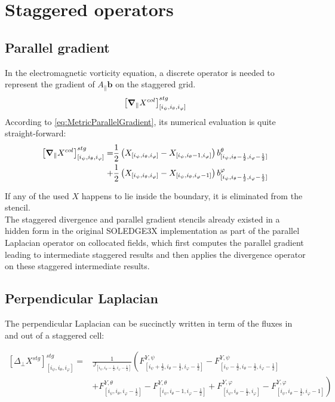 \section{Staggered operators}

\subsection{Parallel gradient}

In the electromagnetic vorticity equation, a discrete operator is needed to represent the gradient of $A_\parallel \mathbf{b}$ on the staggered grid.
$$\left[\grad_\parallel X^{col}\right]^{stg}_{[i_\psi,i_\theta, i_\varphi]}$$
According to \autoref{eq:MetricParallelGradient}, its numerical evaluation is quite straight-forward: 
\begin{align}
	\label{eq:NumericalStaggeredParallelGradientStencil}
	\left[\grad_\parallel X^{col}\right]^{stg}_{[i_\psi,i_\theta, i_\varphi]} =& \frac{1}{2}\left(X_{[i_\psi,i_\theta, i_\varphi]}-X_{[i_\psi,i_\theta-1, i_\varphi]}\right)b_{[i_\psi,i_\theta-\frac{1}{2}, i_\varphi-\frac{1}{2}]}^\theta \nonumber \\ +& 
	\frac{1}{2}\left(X_{[i_\psi,i_\theta, i_\varphi]}-X_{[i_\psi,i_\theta, i_\varphi-1]}\right)b_{[i_\psi,i_\theta-\frac{1}{2}, i_\varphi-\frac{1}{2}]}^\varphi
\end{align}

If any of the used $X$ happens to lie inside the boundary, it is eliminated from the stencil. \\

The staggered divergence and parallel gradient stencils already existed in a hidden form in the original SOLEDGE3X implementation as part of the parallel Laplacian operator on collocated fields, which first computes the parallel gradient leading to intermediate staggered results and then applies the divergence operator on these staggered intermediate results.


\subsection{Perpendicular Laplacian}

The perpendicular Laplacian can be succinctly written in term of the fluxes in and out of a staggered cell:

\begin{align}
	\left[\Delta_{\perp}X^{stg}\right]^{stg}_{[i_\psi,i_\theta, i_\varphi]} =& \frac{1}{J_{[i_\psi,i_\theta-\frac{1}{2}, i_\varphi-\frac{1}{2}]}}\left(F^{Y,\psi}_{[i_\psi+\frac{1}{2},i_\theta-\frac{1}{2}, i_\varphi-\frac{1}{2}]} - F^{Y,\psi}_{[i_\psi-\frac{1}{2},i_\theta-\frac{1}{2}, i_\varphi-\frac{1}{2}]}\right. \nonumber \\ 
	&\left.+ F^{Y,\theta}_{[i_\psi,i_\theta, i_\varphi-\frac{1}{2}]} - F^{Y,\theta}_{[i_\psi,i_\theta-1, i_\varphi-\frac{1}{2}]}+ F^{Y,\varphi}_{[i_\psi,i_\theta-\frac{1}{2}, i_\varphi]} - F^{Y,\varphi}_{[i_\psi,i_\theta-\frac{1}{2}, i_\varphi-1]}\right) 	\label{eq:NumericalStaggeredPerpDiffStencil}	
\end{align}


